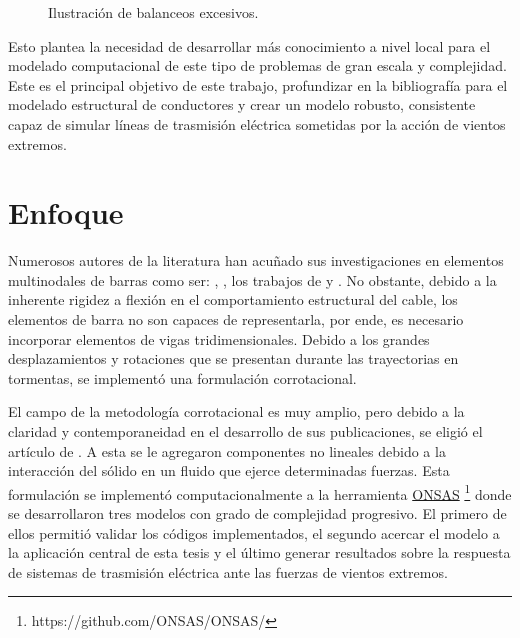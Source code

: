 \begin{figure}[htbp]
	\centering
	\def\svgwidth{80mm}
	
	\caption{Ilustración de balanceos excesivos.}
	\label{fig:INTRO:IlusExcesiveBalance}
\end{figure}  


Esto plantea la necesidad de desarrollar más conocimiento a nivel local para el modelado computacional de este tipo de problemas de gran escala y complejidad. Este es el principal objetivo de este trabajo, profundizar en la bibliografía para el modelado estructural de conductores y crear un modelo robusto, consistente capaz de simular líneas de trasmisión eléctrica sometidas por la acción de vientos extremos.



\section{Enfoque}

Numerosos autores de la literatura han acuñado sus investigaciones en elementos multinodales de barras como ser: \cite{desai1995finite}, \cite{yan2009numerical}, los trabajos de \cite{gani2010dynamic} y \cite{yang2016nonlinear}. No obstante, debido a la inherente rigidez a flexión en el comportamiento estructural del cable, los elementos de barra no son capaces de representarla, por ende, es necesario incorporar elementos de vigas tridimensionales. Debido a los grandes desplazamientos y rotaciones que se presentan durante las trayectorias en tormentas, se implementó una formulación corrotacional.

El campo de la metodología corrotacional es muy amplio, pero debido a la claridad y contemporaneidad en el desarrollo de sus publicaciones, se eligió el artículo de \cite{Le2014}. A esta se le agregaron componentes no lineales debido a la interacción del sólido en un fluido que ejerce determinadas fuerzas. Esta formulación se implementó computacionalmente a la herramienta \href{https://github.com/ONSAS/ONSAS/}{ONSAS} \footnote{https://github.com/ONSAS/ONSAS/} donde se desarrollaron tres modelos con grado de complejidad progresivo. El primero de ellos permitió validar los códigos implementados, el segundo acercar el modelo a la aplicación central de esta tesis y el último generar resultados sobre la respuesta de sistemas de trasmisión eléctrica ante las fuerzas de vientos extremos.


